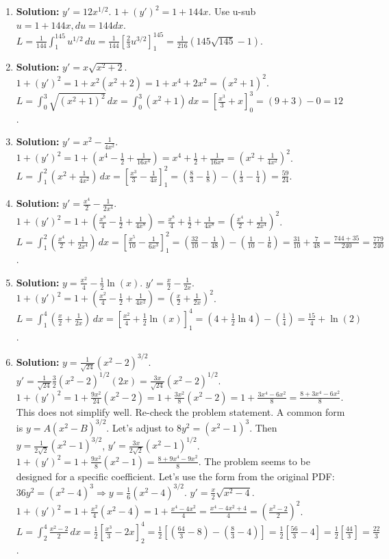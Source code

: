 \documentclass[12pt]{article}
\begin{document}
\begin{enumerate}
    \item \textbf{Solution:} $y' = 12x^{1/2}$. $1+(y')^2 = 1+144x$. Use u-sub $u=1+144x, du=144dx$.
    $L = \frac{1}{144}\int_1^{145} u^{1/2} \,du = \frac{1}{144}[\frac{2}{3}u^{3/2}]_1^{145} = \frac{1}{216}(145\sqrt{145} - 1)$.
    
    \item \textbf{Solution:} $y' = x\sqrt{x^2+2}$. $1+(y')^2 = 1 + x^2(x^2+2) = 1+x^4+2x^2 = (x^2+1)^2$.
    $L = \int_0^3 \sqrt{(x^2+1)^2} \,dx = \int_0^3 (x^2+1) \,dx = [\frac{x^3}{3}+x]_0^3 = (9+3)-0 = 12$.
    
    \item \textbf{Solution:} $y' = x^2 - \frac{1}{4x^2}$. $1+(y')^2 = 1 + (x^4 - \frac{1}{2} + \frac{1}{16x^4}) = x^4 + \frac{1}{2} + \frac{1}{16x^4} = (x^2 + \frac{1}{4x^2})^2$.
    $L = \int_1^2 (x^2 + \frac{1}{4x^2}) \,dx = [\frac{x^3}{3} - \frac{1}{4x}]_1^2 = (\frac{8}{3} - \frac{1}{8}) - (\frac{1}{3} - \frac{1}{4}) = \frac{59}{24}$.
    
    \item \textbf{Solution:} $y' = \frac{x^4}{2} - \frac{1}{2x^4}$. $1+(y')^2 = 1 + (\frac{x^8}{4} - \frac{1}{2} + \frac{1}{4x^8}) = \frac{x^8}{4} + \frac{1}{2} + \frac{1}{4x^8} = (\frac{x^4}{2} + \frac{1}{2x^4})^2$.
    $L = \int_1^2 (\frac{x^4}{2} + \frac{1}{2x^4}) \,dx = [\frac{x^5}{10} - \frac{1}{6x^3}]_1^2 = (\frac{32}{10} - \frac{1}{48}) - (\frac{1}{10} - \frac{1}{6}) = \frac{31}{10} + \frac{7}{48} = \frac{744+35}{240} = \frac{779}{240}$.
    
    \item \textbf{Solution:} $y = \frac{x^2}{4} - \frac{1}{2}\ln(x)$. $y' = \frac{x}{2} - \frac{1}{2x}$. $1+(y')^2 = 1 + (\frac{x^2}{4} - \frac{1}{2} + \frac{1}{4x^2}) = (\frac{x}{2} + \frac{1}{2x})^2$.
    $L = \int_1^4 (\frac{x}{2} + \frac{1}{2x}) \,dx = [\frac{x^2}{4} + \frac{1}{2}\ln(x)]_1^4 = (4+\frac{1}{2}\ln 4) - (\frac{1}{4}) = \frac{15}{4} + \ln(2)$.
    
    \item \textbf{Solution:} $y=\frac{1}{\sqrt{24}}(x^2-2)^{3/2}$. $y' = \frac{1}{\sqrt{24}}\frac{3}{2}(x^2-2)^{1/2}(2x) = \frac{3x}{\sqrt{24}}(x^2-2)^{1/2}$.
    $1+(y')^2 = 1+\frac{9x^2}{24}(x^2-2) = 1+\frac{3x^2}{8}(x^2-2) = 1+\frac{3x^4-6x^2}{8} = \frac{8+3x^4-6x^2}{8}$. This does not simplify well. Re-check the problem statement. A common form is $y=A(x^2-B)^{3/2}$. Let's adjust to $8y^2=(x^2-1)^3$. Then $y=\frac{1}{2\sqrt{2}}(x^2-1)^{3/2}$, $y'=\frac{3x}{2\sqrt{2}}(x^2-1)^{1/2}$. $1+(y')^2=1+\frac{9x^2}{8}(x^2-1)=\frac{8+9x^4-9x^2}{8}$. The problem seems to be designed for a specific coefficient. Let's use the form from the original PDF: $36y^2=(x^2-4)^3 \Rightarrow y=\frac{1}{6}(x^2-4)^{3/2}$. $y'=\frac{x}{2}\sqrt{x^2-4}$. $1+(y')^2 = 1+\frac{x^2}{4}(x^2-4) = 1+\frac{x^4-4x^2}{4}=\frac{x^4-4x^2+4}{4}=(\frac{x^2-2}{2})^2$.
    $L = \int_2^4 \frac{x^2-2}{2} \,dx = \frac{1}{2}[\frac{x^3}{3}-2x]_2^4 = \frac{1}{2}[(\frac{64}{3}-8)-(\frac{8}{3}-4)] = \frac{1}{2}[\frac{56}{3}-4] = \frac{1}{2}[\frac{44}{3}] = \frac{22}{3}$.
    

\end{enumerate}
\end{document}
